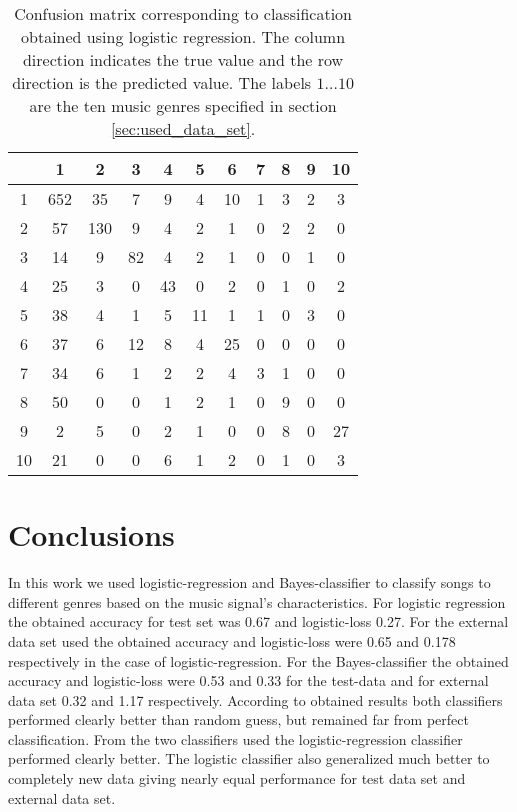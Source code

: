 \documentclass[aps,prb,10pt,twocolumn,groupedaddress]{revtex4-1}
\begin{document}
\begin{center}
  \begin{table}
    \caption{Confusion matrix corresponding to classification obtained using
      logistic regression. The column direction indicates the true value and
      the row direction is the predicted value.  The labels $1\ldots10$ are
      the ten music genres specified in section \ref{sec:used_data_set}.}
    \begin{tabular*}{0.45\textwidth}{@{\extracolsep{\fill}}c|cccccccccc}
        & 1 & 2 & 3 & 4 & 5 & 6 & 7 & 8 & 9 & 10\\
      \hline
      1 & 652 & 35 & 7 & 9 & 4 & 10 & 1 & 3 & 2 & 3\\
      2 & 57 & 130 & 9 & 4 & 2 & 1 & 0 & 2 & 2 & 0\\
      3 & 14 & 9 & 82 & 4 & 2 & 1 & 0 & 0 & 1 & 0 \\
      4 & 25 & 3 & 0 & 43 & 0 & 2 & 0 & 1 & 0 & 2 \\
      5 & 38 & 4 & 1 & 5 & 11 & 1 & 1 & 0 & 3 & 0 \\
      6 & 37 & 6 & 12 & 8 & 4 & 25 & 0 & 0 & 0 & 0 \\
      7 & 34 & 6 & 1 & 2 & 2 & 4 & 3 & 1 & 0 & 0 \\
      8 & 50 & 0 & 0 & 1 & 2 & 1 & 0 & 9 & 0 & 0 \\
      9 & 2 & 5 & 0 & 2 & 1 & 0 & 0 & 8 & 0 & 27 \\
      10 & 21 & 0 & 0 & 6 & 1 & 2 & 0 & 1 & 0 & 3\\
      \end{tabular*}
    \label{tab:confusion_log_reg}
  \end{table}
\end{center}


\section{Conclusions}
\label{sec:conclusions}
In this work we used logistic-regression and Bayes-classifier to classify songs
to different genres based on the music signal's characteristics. For logistic
regression the obtained accuracy for test set was 0.67 and logistic-loss 0.27.
For the external data set used the obtained accuracy and logistic-loss were 0.65
and 0.178 respectively in the case of logistic-regression. For the
Bayes-classifier the obtained accuracy and logistic-loss were 0.53 and 0.33 for
the test-data and for external data set 0.32 and 1.17 respectively. According to
obtained results both classifiers performed clearly better than random guess,
but remained far from perfect classification. From the two classifiers used
the logistic-regression classifier performed clearly better. The logistic
classifier also generalized much better to completely new data giving nearly
equal performance for test data set and external data set.


\end{document}
